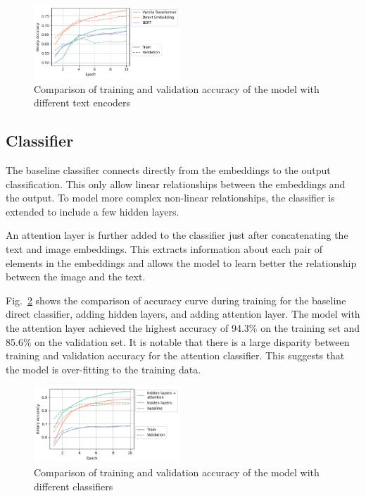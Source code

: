 \documentclass[conference]{IEEEtran}
\begin{document}
\begin{figure}
    \centering
    \includegraphics[width=0.49\textwidth]{text_encoder_comparison.png}
    \caption{Comparison of training and validation accuracy of the model with different text encoders}
    \label{fig:text_encoder_comparison}
\end{figure}

\subsection{Classifier}

The baseline classifier connects directly from the embeddings to the output classification. This only allow linear relationships between the embeddings and the output. To model more complex non-linear relationships, the classifier is extended to include a few hidden layers.

An attention layer is further added to the classifier just after concatenating the text and image embeddings. This extracts information about each pair of elements in the embeddings and allows the model to learn better the relationship between the image and the text.

Fig.~\ref{fig:classifier_comparison} shows the comparison of accuracy curve during training for the baseline direct classifier, adding hidden layers, and adding attention layer. The model with the attention layer achieved the highest accuracy of 94.3\% on the training set and 85.6\% on the validation set. It is notable that there is a large disparity between training and validation accuracy for the attention classifier. This suggests that the model is over-fitting to the training data.

\begin{figure}
    \centering
    \includegraphics[width=0.49\textwidth]{classifier_comparison.png}
    \caption{Comparison of training and validation accuracy of the model with different classifiers}
    \label{fig:classifier_comparison}
\end{figure}
\end{document}
